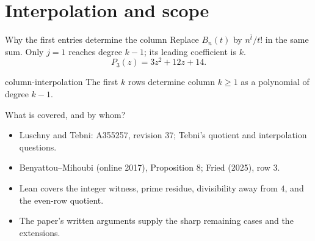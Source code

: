 \documentclass{beamer}
\begin{document}
\section{Interpolation and scope}
\begin{frame}{Why the first entries determine the column}
  Replace $B_n(t)$ by $n^{\overline t}/t!$ in the same sum.
  Only $j=1$ reaches degree $k-1$; its leading coefficient is $k$.
  \[P_3(z)=3z^2+12z+14.\]
  \begin{bookresult}{column-interpolation}
  The first $k$ rows determine column $k\ge1$ as a polynomial of degree $k-1$.
  \end{bookresult}
\end{frame}
\begin{frame}{What is covered, and by whom?}
  \begin{itemize}
  \item Luschny and Tebni: A355257, revision 37; Tebni's quotient and interpolation questions.
  \item Benyattou--Mihoubi (online 2017), Proposition 8; Fried (2025), row $3$.
  \item Lean covers the integer witness, prime residue, divisibility away from $4$, and the even-row quotient.
  \item The paper's written arguments supply the sharp remaining cases and the extensions.
  \end{itemize}
\end{frame}
\appendix
\FormalVerification
\end{document}
